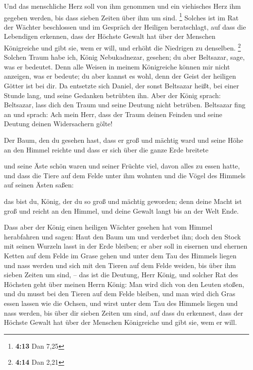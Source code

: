  Und das menschliche Herz soll von ihm genommen und ein
viehisches Herz ihm gegeben werden, bis dass sieben Zeiten über ihm um
sind. \footnote{\textbf{4:13} Dan 7,25}  Solches ist im Rat
der Wächter beschlossen und im Gespräch der Heiligen beratschlagt, auf
dass die Lebendigen erkennen, dass der Höchste Gewalt hat über der
Menschen Königreiche und gibt sie, wem er will, und erhöht die Niedrigen
zu denselben. \footnote{\textbf{4:14} Dan 2,21}  Solchen
Traum habe ich, König Nebukadnezar, gesehen; du aber Beltsazar, sage,
was er bedeutet. Denn alle Weisen in meinem Königreiche können mir nicht
anzeigen, was er bedeute; du aber kannst es wohl, denn der Geist der
heiligen Götter ist bei dir.  Da entsetzte sich Daniel, der
sonst Beltsazar heißt, bei einer Stunde lang, und seine Gedanken
betrübten ihn. Aber der König sprach: Beltsazar, lass dich den Traum und
seine Deutung nicht betrüben. Beltsazar fing an und sprach: Ach mein
Herr, dass der Traum deinen Feinden und seine Deutung deinen
Widersachern gölte!

 Der Baum, den du gesehen hast, dass er groß und mächtig
ward und seine Höhe an den Himmel reichte und dass er sich über die
ganze Erde breitete

 und seine Äste schön waren und seiner Früchte viel, davon
alles zu essen hatte, und dass die Tiere auf dem Felde unter ihm wohnten
und die Vögel des Himmels auf seinen Ästen saßen:

 das bist du, König, der du so groß und mächtig geworden;
denn deine Macht ist groß und reicht an den Himmel, und deine Gewalt
langt bis an der Welt Ende.

 Dass aber der König einen heiligen Wächter gesehen hat vom
Himmel herabfahren und sagen: Haut den Baum um und verderbet ihn; doch
den Stock mit seinen Wurzeln lasst in der Erde bleiben; er aber soll in
eisernen und ehernen Ketten auf dem Felde im Grase gehen und unter dem
Tau des Himmels liegen und nass werden und sich mit den Tieren auf dem
Felde weiden, bis über ihm sieben Zeiten um sind, --  das
ist die Deutung, Herr König, und solcher Rat des Höchsten geht über
meinen Herrn König:  Man wird dich von den Leuten stoßen,
und du musst bei den Tieren auf dem Felde bleiben, und man wird dich
Gras essen lassen wie die Ochsen, und wirst unter dem Tau des Himmels
liegen und nass werden, bis über dir sieben Zeiten um sind, auf dass du
erkennest, dass der Höchste Gewalt hat über der Menschen Königreiche und
gibt sie, wem er will.


